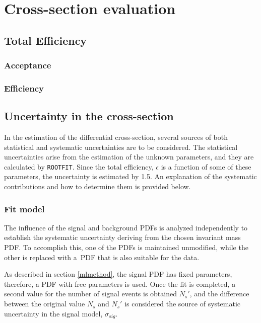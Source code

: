 \chapter[\leavevmode\newline Cross-section evaluation]{Cross-section evaluation}
\label{chap:Chapter_5}
\lipsum[5]

\section{Total Efficiency}
\subsection{Acceptance}

\subsection{Efficiency}

\section{Uncertainty in the cross-section}

In the estimation of the differential cross-section, several sources of both statistical and systematic uncertainties are to be considered. The statistical uncertainties arise from the estimation of the unknown parameters, and they are calculated by \verb|ROOTFIT|. Since the total efficiency, $\epsilon$ is a function of some of these parameters, the uncertainty is estimated by 1.5. An explanation of the systematic contributions and how to determine them is provided below. 

\subsection{Fit model}

The influence of the signal and background PDFs is analyzed independently to establish the systematic uncertainty deriving from the chosen invariant mass PDF. To accomplish this, one of the PDFs is maintained unmodified, while the other is replaced with a PDF that is also suitable for the data.

As described in section \ref{mlmethod}, the signal PDF has fixed parameters, therefore, a PDF with free parameters is used. Once the fit is completed, a second value for the number of signal events is obtained $N_s'$, and the difference between the original value $N_s$ and $N_s'$ is considered the source of systematic uncertainty in the signal model, $\sigma_{sig}$.

